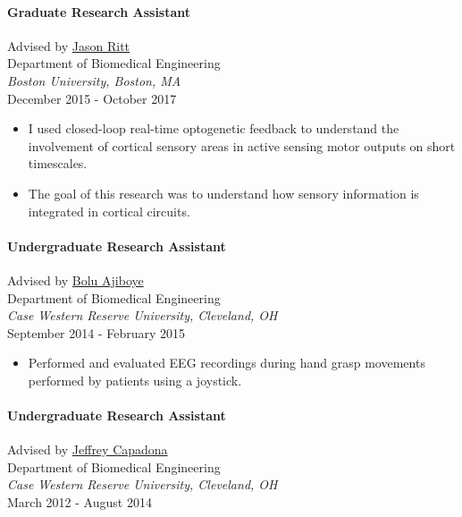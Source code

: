 \documentclass[
  letterpaper,
  DIV=11,
  numbers=noendperiod]{scrartcl}
\let\oldparagraph\paragraph
\renewcommand{\paragraph}[1]{\oldparagraph{#1}\mbox{}}
\providecommand{\tightlist}{%
  \setlength{\itemsep}{0pt}\setlength{\parskip}{0pt}}\usepackage{longtable,booktabs,array}
\begin{document}
\hypertarget{graduate-research-assistant-1}{%
\paragraph{Graduate Research
Assistant}\label{graduate-research-assistant-1}}

Advised by \href{https://vivo.brown.edu/display/jritt}{Jason Ritt}\\
Department of Biomedical Engineering\\
\emph{Boston University, Boston, MA}\\
December 2015 - October 2017

\begin{itemize}
\tightlist
\item
  I used closed-loop real-time optogenetic feedback to understand the
  involvement of cortical sensory areas in active sensing motor outputs
  on short timescales.
\item
  The goal of this research was to understand how sensory information is
  integrated in cortical circuits.
\end{itemize}

\hypertarget{undergraduate-research-assistant}{%
\paragraph{Undergraduate Research
Assistant}\label{undergraduate-research-assistant}}

Advised by \href{https://www.braingate.org/team/bolu-ajiboye-ph-d/}{Bolu
Ajiboye}\\
Department of Biomedical Engineering\\
\emph{Case Western Reserve University, Cleveland, OH}\\
September 2014 - February 2015

\begin{itemize}
\tightlist
\item
  Performed and evaluated EEG recordings during hand grasp movements
  performed by patients using a joystick.
\end{itemize}

\hypertarget{undergraduate-research-assistant-1}{%
\paragraph{Undergraduate Research
Assistant}\label{undergraduate-research-assistant-1}}

Advised by \href{https://engineering.case.edu/ebme/capadona}{Jeffrey
Capadona}\\
Department of Biomedical Engineering\\
\emph{Case Western Reserve University, Cleveland, OH}\\
March 2012 - August 2014
\end{document}
